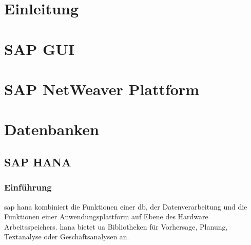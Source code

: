 \section{Einleitung}
\section{SAP GUI}
\label{sec:sapgui}

\section{SAP NetWeaver Plattform}
\label{sec:netweaver}

\section{Datenbanken}

\subsection{SAP HANA}
\label{sec:db-hana}

\subsubsection{Einführung}
\label{sec:db-hana-intro}
\gls{sap} \gls{hana} kombiniert die Funktionen einer \gls{db}, der Datenverarbeitung und die Funktionen einer Anwendungsplattform auf Ebene des Hardware Arbeitsspeichers. \gls{hana} bietet \gls{ua} Bibliotheken für Vorhersage, Planung, Textanalyse oder Geschäftsanalysen an.\\

